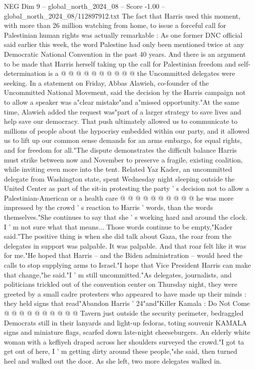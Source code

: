 \begin{textsample}{NEG Dim 9 – global\_north\_2024\_08 – Score -1.00 – global\_north\_2024\_08/112897912.txt}
The fact that Harris used this moment, with more than 26 million watching from home, to issue a forceful call for Palestinian human rights was actually remarkable : As one former DNC official said earlier this week, the word Palestine had only been mentioned twice at any Democratic National Convention in the past 40 years.
And there is an argument to be made that Harris herself taking up the call for Palestinian freedom and self-determination is a @ @ @ @ @ @ @ @ @ @ the Uncommitted delegates were seeking.
In a statement on Friday, Abbas Alawieh, co-founder of the Uncommitted National Movement, said the decision by the Harris campaign not to allow a speaker was a"clear mistake"and a"missed opportunity."At the same time, Alawieh added the request was"part of a larger strategy to save lives and help save our democracy.
That push ultimately allowed us to communicate to millions of people about the hypocrisy embedded within our party, and it allowed us to lift up our common sense demands for an arms embargo, for equal rights, and for freedom for all."The dispute demonstrates the difficult balance Harris must strike between now and November to preserve a fragile, existing coalition, while inviting even more into the tent.
Related Yaz Kader, an uncommitted delegate from Washington state, spent Wednesday night sleeping outside the United Center as part of the sit-in protesting the party ' s decision not to allow a Palestinian-American or a health care @ @ @ @ @ @ @ @ @ @ he was more impressed by the crowd ' s reaction to Harris ' words, than the words themselves."She continues to say that she ' s working hard and around the clock.
I ' m not sure what that means...
Those words continue to be empty,"Kader said."The positive thing is when she did talk about Gaza, the roar from the delegates in support was palpable.
It was palpable.
And that roar felt like it was for me."He hoped that Harris -- and the Biden administration -- would heed the calls to stop supplying arms to Israel."I hope that Vice President Harris can make that change,"he said."I ' m still uncommitted."As delegates, journalists, and politicians trickled out of the convention center on Thursday night, they were greeted by a small cadre protesters who appeared to have made up their minds : they held signs that read"Abandon Harris ' 24"and"Killer Kamala : Do Not Come @ @ @ @ @ @ @ @ @ @ Tavern just outside the security perimeter, bedraggled Democrats still in their lanyards and light-up fedoras, toting souvenir KAMALA signs and miniature flags, scarfed down late-night cheeseburgers.
An elderly white woman with a keffiyeh draped across her shoulders surveyed the crowd."I got ta get out of here, I ' m getting dirty around these people,"she said, then turned heel and walked out the door.
As she left, two more delegates walked in.

\end{textsample}
